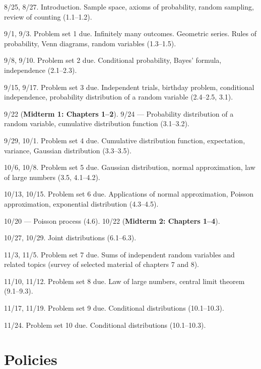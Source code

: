 \documentclass[oneside,11pt]{amsart}
\begin{document}
\begin{enumerate}[\bf{}{[}week 1{]}]
	\item 8/25, 8/27. Introduction. Sample space, axioms of probability, random sampling, review of counting (1.1--1.2).
	\item 9/1, 9/3. Problem set 1 due.
		Infinitely many outcomes. Geometric series. 
		Rules of probability, Venn diagrams, random variables
		(1.3--1.5).
	\item 9/8, 9/10. Problem set 2 due.
		Conditional probability, Bayes' formula, independence
		(2.1--2.3).
	\item 9/15, 9/17. Problem set 3 due.
		Independent trials, birthday problem, conditional independence, 
		probability distribution of a random variable
		(2.4--2.5, 3.1).
	\item 9/22 (\textbf{Midterm 1: Chapters 1--2}). 9/24 --- 
		Probability distribution of a random variable,
		cumulative distribution function (3.1--3.2).
	\item 9/29, 10/1. Problem set 4 due.
		Cumulative distribution function, 
		expectation, variance, 
		Gaussian distribution
		(3.3--3.5).
	\item 10/6, 10/8. Problem set 5 due.
		Gaussian distribution, normal approximation,
		law of large numbers
		(3.5, 4.1--4.2).
	\item 10/13, 10/15. Problem set 6 due.
		Applications of normal approximation, 
		Poisson approximation, exponential distribution
		(4.3--4.5).
	\item 10/20 --- Poisson process (4.6). 10/22 (\textbf{Midterm 2: Chapters 1--4}).
	\item 10/27, 10/29. 
		Joint distributions (6.1--6.3).
	\item 11/3, 11/5. Problem set 7 due.
		Sums of independent random variables and related topics (survey of 
		selected material of chapters 7 and 8).
	\item 11/10, 11/12. Problem set 8 due.
		Law of large numbers, central limit theorem (9.1--9.3).
	\item 11/17, 11/19. Problem set 9 due.
		Conditional distributions (10.1--10.3).
	\item 11/24. Problem set 10 due.
		Conditional distributions (10.1--10.3).
\end{enumerate}

\section{Policies}
\end{document}
